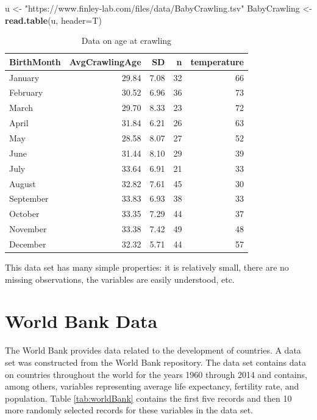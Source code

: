 \documentclass[
]{krantz}
\makeatletter
\newenvironment{Shaded}{\begin{snugshade}}{\end{snugshade}}
\newcommand{\DataTypeTok}[1]{\textcolor[rgb]{0.27,0.27,0.27}{#1}}
\newcommand{\KeywordTok}[1]{\textcolor[rgb]{0.27,0.27,0.27}{\textbf{#1}}}
\newcommand{\NormalTok}[1]{#1}
\newcommand{\StringTok}[1]{\textcolor[rgb]{0.5,0.5,0.5}{#1}}
\newenvironment{kframe}{%
\medskip{}
\setlength{\fboxsep}{.8em}
 \def\at@end@of@kframe{}%
 \ifinner\ifhmode%
  \def\at@end@of@kframe{\end{minipage}}%
  \begin{minipage}{\columnwidth}%
 \fi\fi%
 \def\FrameCommand##1{\hskip\@totalleftmargin \hskip-\fboxsep
 \colorbox{shadecolor}{##1}\hskip-\fboxsep
     \hskip-\linewidth \hskip-\@totalleftmargin \hskip\columnwidth}%
 \MakeFramed {\advance\hsize-\width
   \@totalleftmargin\z@ \linewidth\hsize
   \@setminipage}}%
 {\par\unskip\endMakeFramed%
 \at@end@of@kframe}
\renewenvironment{Shaded}{\begin{kframe}}{\end{kframe}}
\makeatother
\begin{document}
\begin{Shaded}
\begin{Highlighting}[]
\NormalTok{u \textless{}{-}}\StringTok{ "https://www.finley{-}lab.com/files/data/BabyCrawling.tsv"}
\NormalTok{BabyCrawling \textless{}{-}}\StringTok{ }\KeywordTok{read.table}\NormalTok{(u, }\DataTypeTok{header=}\NormalTok{T)}
\end{Highlighting}
\end{Shaded}

\begin{table}

\caption{\label{tab:crawling}Data on age at crawling}
\centering
\begin{tabular}[t]{lrrrr}
\toprule
BirthMonth & AvgCrawlingAge & SD & n & temperature\\
\midrule
January & 29.84 & 7.08 & 32 & 66\\
February & 30.52 & 6.96 & 36 & 73\\
March & 29.70 & 8.33 & 23 & 72\\
April & 31.84 & 6.21 & 26 & 63\\
May & 28.58 & 8.07 & 27 & 52\\
\addlinespace
June & 31.44 & 8.10 & 29 & 39\\
July & 33.64 & 6.91 & 21 & 33\\
August & 32.82 & 7.61 & 45 & 30\\
September & 33.83 & 6.93 & 38 & 33\\
October & 33.35 & 7.29 & 44 & 37\\
\addlinespace
November & 33.38 & 7.42 & 49 & 48\\
December & 32.32 & 5.71 & 44 & 57\\
\bottomrule
\end{tabular}
\end{table}

This data set has many simple properties: it is relatively small, there are no missing observations, the variables are easily understood, etc.

\hypertarget{world-bank-data}{%
\section{World Bank Data}\label{world-bank-data}}

The World Bank provides data related to the development of countries. A data set was constructed from the World Bank repository. The data set contains data on countries throughout the world for the years 1960 through 2014 and contains, among others, variables representing average life expectancy, fertility rate, and population. Table \ref{tab:worldBank} contains the first five records and then 10 more randomly selected records for these variables in the data set.
\end{document}
